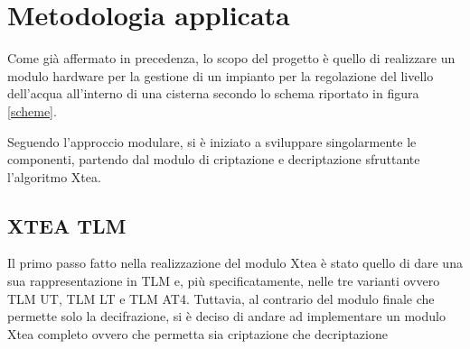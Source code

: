 \documentclass[]{IEEEtran}
\begin{document}
\section{Metodologia applicata}
Come già affermato in precedenza, lo scopo del progetto è quello di realizzare un modulo hardware per la gestione di un impianto per la regolazione del livello dell'acqua all'interno di una cisterna secondo lo schema riportato in figura \ref{scheme}.


Seguendo l'approccio modulare, si è iniziato a sviluppare singolarmente le componenti, partendo dal modulo di criptazione e decriptazione sfruttante l'algoritmo Xtea.
\subsection{XTEA TLM}

Il primo passo fatto nella realizzazione del modulo Xtea è stato quello di dare una sua rappresentazione in TLM e, più specificatamente, nelle tre varianti ovvero TLM UT, TLM LT e TLM AT4. Tuttavia, al contrario del modulo finale che permette solo la decifrazione, si è deciso di andare ad implementare un modulo Xtea completo ovvero che permetta sia criptazione che decriptazione
\end{document}
